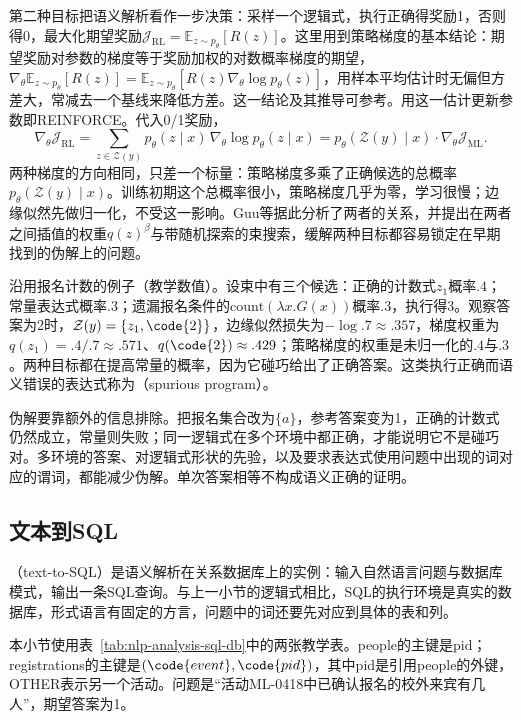 第二种目标把语义解析看作一步决策：采样一个逻辑式，执行正确得奖励1，否则得0，最大化期望奖励$\mathcal J_{\mathrm{RL}}=\mathbb E_{z\sim p_\theta}[R(z)]$。这里用到策略梯度的基本结论：期望奖励对参数的梯度等于奖励加权的对数概率梯度的期望，$\nabla_\theta\mathbb E_{z\sim p_\theta}[R(z)]=\mathbb E_{z\sim p_\theta}[R(z)\nabla_\theta\log p_\theta(z)]$，用样本平均估计时无偏但方差大，常减去一个基线来降低方差。这一结论及其推导可参考。用这一估计更新参数即REINFORCE。代入0/1奖励，
\[
 \nabla_\theta\mathcal J_{\mathrm{RL}}=\sum_{z\in\mathcal Z(y)}p_\theta(z\mid x)\,\nabla_\theta\log p_\theta(z\mid x)
 =p_\theta(\mathcal Z(y)\mid x)\cdot\nabla_\theta\mathcal J_{\mathrm{ML}}.
\]
两种梯度的方向相同，只差一个标量：策略梯度多乘了正确候选的总概率$p_\theta(\mathcal Z(y)\mid x)$。训练初期这个总概率很小，策略梯度几乎为零，学习很慢；边缘似然先做归一化，不受这一影响。Guu等据此分析了两者的关系，并提出在两者之间插值的权重$q(z)^\beta$与带随机探索的束搜索，缓解两种目标都容易锁定在早期找到的伪解上的问题。

沿用报名计数的例子（教学数值）。设束中有三个候选：正确的计数式$z_1$概率$.4$；常量表达式概率$.3$；遗漏报名条件的$\mathrm{count}(\lambda x.G(x))$概率$.3$，执行得3。观察答案为2时，$\mathcal Z(y)=\{z_1,\code{2}\}$，边缘似然损失为$-\log .7\approx.357$，梯度权重为$q(z_1)=.4/.7\approx.571$、$q(\code{2})\approx.429$；策略梯度的权重是未归一化的$.4$与$.3$。两种目标都在提高常量的概率，因为它碰巧给出了正确答案。这类执行正确而语义错误的表达式称为（spurious program）。

伪解要靠额外的信息排除。把报名集合改为$\{a\}$，参考答案变为1，正确的计数式仍然成立，常量则失败；同一逻辑式在多个环境中都正确，才能说明它不是碰巧对。多环境的答案、对逻辑式形状的先验，以及要求表达式使用问题中出现的词对应的谓词，都能减少伪解。单次答案相等不构成语义正确的证明。

\subsection{文本到SQL}
\label{sec:nlp-analysis-text-to-sql}

（text-to-SQL）是语义解析在关系数据库上的实例：输入自然语言问题与数据库模式，输出一条SQL查询。与上一小节的逻辑式相比，SQL的执行环境是真实的数据库，形式语言有固定的方言，问题中的词还要先对应到具体的表和列。

本小节使用表~\ref{tab:nlp-analysis-sql-db}中的两张教学表。people的主键是pid；registrations的主键是$(\code{event},\code{pid})$，其中pid是引用people的外键，OTHER表示另一个活动。问题是“活动ML-0418中已确认报名的校外来宾有几人”，期望答案为1。

